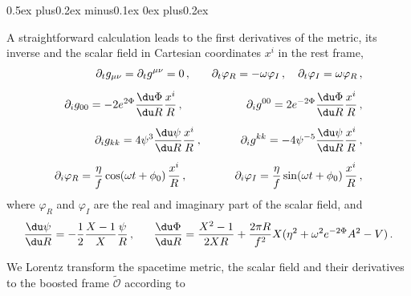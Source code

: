 \begin{list}{\rm{\bf ()}}{
                
             \parsep0.5ex plus0.2ex minus0.1ex \itemsep0ex plus0.2ex}
  \item A straightforward calculation leads to the first derivatives of the
  metric, its inverse and the scalar field in Cartesian coordinates $x^i$ in the rest frame,
  \begin{eqnarray}
    \partial_t g_{\mu\nu}=\partial_t g^{\mu\nu}=0\,,~~~&&
    \partial_t \varphi_R = -\omega \varphi_I\,,~~~
    \partial_t \varphi_I = \omega \varphi_R\,,
    \nonumber \\[5pt]
    \partial_i g_{00} = -2e^{2\Phi}\frac{\du \Phi}{\du R} \frac{x^i}{R}\,,
    ~~~~~&&
    \partial_i g^{00} = 2e^{-2\Phi} \frac{\du \Phi}{\du R}\frac{x^i}{R}\,,
    \nonumber \\[5pt]
    \partial_i g_{kk} = 4\psi^3 \frac{\du \psi}{\du R} \frac{x^i}{R}\,,
    && \partial_i g^{kk} = -4\psi^{-5} \frac{\du \psi}{\du R}
          \frac{x^i}{R}\,,
    \nonumber \\[5pt]
    \partial_i \varphi_R = \frac{\eta}{f} \cos(\omega t + \phi_0)\,
        \frac{x^i}{R}\,,~~~~&&
  \partial_i \varphi_I = \frac{\eta}{f} \sin(\omega t + \phi_0)\,
        \frac{x^i}{R}\,,
  \end{eqnarray}
  where $\varphi_R$ and $\varphi_I$ are the real and imaginary part of the
  scalar field, and
  \begin{equation}
    \frac{\du \psi}{\du R} = -\frac{1}{2}
        \frac{X-1}{X} \frac{\psi}{R}\,,~~~~~
        \displaystyle \frac{\du \Phi}{\du R}=
        \frac{X^2-1}{2XR}+\frac{2\pi R}{f^2}X(\eta^2+\omega^2
        e^{-2\Phi}A^2-V)\,.
  \end{equation}
  \item We Lorentz transform the spacetime metric, the scalar field and their
  derivatives to the boosted frame $\tilde{\mathcal{O}}$ according to

\end{list}
